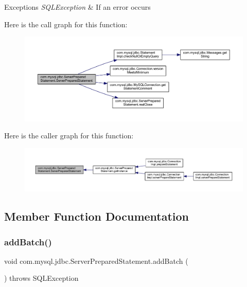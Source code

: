 \begin{DoxyExceptions}{Exceptions}
{\em S\+Q\+L\+Exception} & If an error occurs \\
\hline
\end{DoxyExceptions}
Here is the call graph for this function\+:
\nopagebreak
\begin{figure}[H]
\begin{center}
\leavevmode
\includegraphics[width=350pt]{classcom_1_1mysql_1_1jdbc_1_1_server_prepared_statement_a18c9d09a55d3c02fda15e64e5c818c8f_cgraph}
\end{center}
\end{figure}
Here is the caller graph for this function\+:
\nopagebreak
\begin{figure}[H]
\begin{center}
\leavevmode
\includegraphics[width=350pt]{classcom_1_1mysql_1_1jdbc_1_1_server_prepared_statement_a18c9d09a55d3c02fda15e64e5c818c8f_icgraph}
\end{center}
\end{figure}


\subsection{Member Function Documentation}
\mbox{\label{classcom_1_1mysql_1_1jdbc_1_1_server_prepared_statement_a433afad2cb519d3cfcab97083295d1ce}} 
\subsubsection{\texorpdfstring{add\+Batch()}{addBatch()}}
{\footnotesize\ttfamily void com.\+mysql.\+jdbc.\+Server\+Prepared\+Statement.\+add\+Batch (\begin{DoxyParamCaption}{ }\end{DoxyParamCaption}) throws S\+Q\+L\+Exception}

